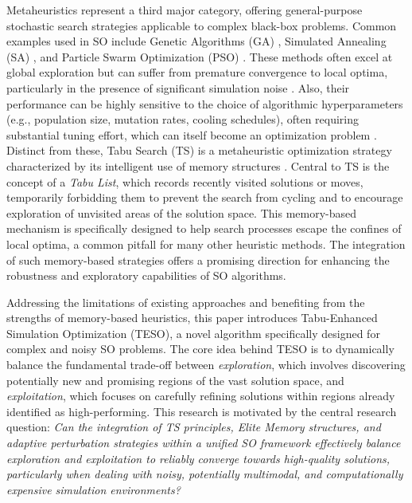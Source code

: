 \documentclass{article}
\begin{document}
Metaheuristics represent a third major category, offering general-purpose stochastic search strategies applicable to complex black-box problems. Common examples used in SO include Genetic Algorithms (GA) \cite{de2015development}, Simulated Annealing (SA) \cite{haddock1992simulation}, and Particle Swarm Optimization (PSO) \cite{kuo2011simulation}. These methods often excel at global exploration but can suffer from premature convergence to local optima, particularly in the presence of significant simulation noise \cite{brahim2024metaheuristic}. Also, their performance can be highly sensitive to the choice of algorithmic hyperparameters (e.g., population size, mutation rates, cooling schedules), often requiring substantial tuning effort, which can itself become an optimization problem \cite{10408315}. Distinct from these, Tabu Search (TS) is a metaheuristic optimization strategy characterized by its intelligent use of memory structures \cite{glover1990tabu}. Central to TS is the concept of a \textit{Tabu List}, which records recently visited solutions or moves, temporarily forbidding them to prevent the search from cycling and to encourage exploration of unvisited areas of the solution space. This memory-based mechanism is specifically designed to help search processes escape the confines of local optima, a common pitfall for many other heuristic methods. The integration of such memory-based strategies offers a promising direction for enhancing the robustness and exploratory capabilities of SO algorithms.


Addressing the limitations of existing approaches and benefiting from the strengths of memory-based heuristics, this paper introduces Tabu-Enhanced Simulation Optimization (TESO), a novel algorithm specifically designed for complex and noisy SO problems. The core idea behind TESO is to dynamically balance the fundamental trade-off between \textit{exploration}, which involves discovering potentially new and promising regions of the vast solution space, and \textit{exploitation}, which focuses on carefully refining solutions within regions already identified as high-performing.  This research is motivated by the central research question: \textit{Can the integration of TS principles, Elite Memory structures, and adaptive perturbation strategies within a unified SO framework effectively balance exploration and exploitation to reliably converge towards high-quality solutions, particularly when dealing with noisy, potentially multimodal, and computationally expensive simulation environments?}
\end{document}
